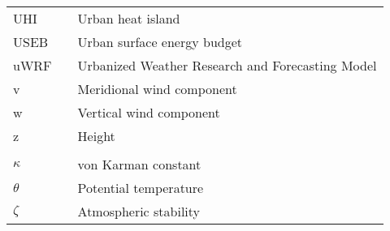 \begin{center}
\begin{tabular}{lll}
    UHI  & \dotfill & Urban heat island \\
    USEB  & \dotfill & Urban surface energy budget \\
    uWRF  & \dotfill & Urbanized Weather Research and Forecasting Model \\
    v & \dotfill & Meridional wind component \\
    w & \dotfill & Vertical wind component \\
    z  & \dotfill & Height \\
     & & \\
    $\kappa$  & \dotfill & von Karman constant \\
    $\theta$  & \dotfill & Potential temperature \\
    $\zeta$  & \dotfill & Atmospheric stability \\
  \end{tabular}
\end{center}
\cleardoublepage


\newpage
\endofprelim
